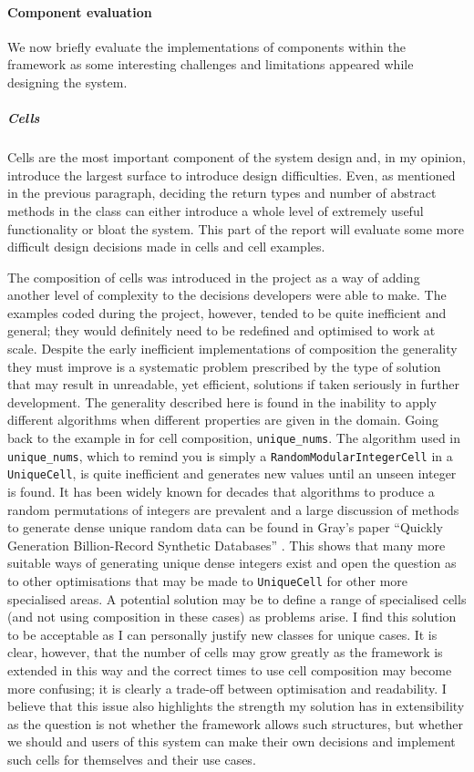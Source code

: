 \paragraph{Component evaluation} We now briefly evaluate the implementations of
components within the framework as some interesting challenges and limitations
appeared while designing the system.

\subparagraph{Cells} Cells are the most important component of the system design
and, in my opinion, introduce the largest surface to introduce design difficulties.
Even, as mentioned in the previous paragraph, deciding the return types and
number of abstract methods in the class can either introduce a whole level of
extremely useful functionality or bloat the system. This part of the report will
evaluate some more difficult design decisions made in cells and cell examples.

The composition of cells was introduced in the project as a way of adding another
level of complexity to the decisions developers were able to make. The examples
coded during the project, however, tended to be quite inefficient and general;
they would definitely need to be redefined and optimised to work at scale.
Despite the early inefficient implementations of composition the generality they
must improve is a systematic problem prescribed by the type of solution that may result in unreadable, yet
efficient, solutions if taken seriously in further development. The
generality described here is found in the inability to apply different
algorithms when different properties are given in the domain. Going back to the
example in  for cell composition,
\lstinline{unique_nums}. The algorithm used in \lstinline{unique_nums}, which
to remind you is simply a \lstinline{RandomModularIntegerCell} in a
\lstinline{UniqueCell}, is quite inefficient and generates new values until an unseen
integer is found. It has been widely known for decades that algorithms to
produce a random permutations of integers are prevalent and a large discussion
of methods to generate dense
unique random data can be found in Gray's paper ``Quickly Generation
Billion-Record Synthetic Databases'' \cite{GenLargeSynthDB}. This shows that
many more suitable ways of generating unique dense integers exist and open the
question as to other optimisations that may be made to \lstinline{UniqueCell}
for other more specialised areas. A potential solution may be to define a range
of specialised cells (and not using composition in these cases) as problems
arise. I find this solution to be acceptable as I can personally justify new
classes for unique cases. It is clear, however, that the number of cells may
grow greatly as the framework is extended in this way and the correct times to
use cell composition may become more confusing; it is
clearly a trade-off between optimisation and readability. I believe that this
issue also highlights the strength my solution has in extensibility as the
question is not whether the framework allows such structures, but whether we
should and users of this system can make their own decisions and implement such
cells for themselves and their use cases.

